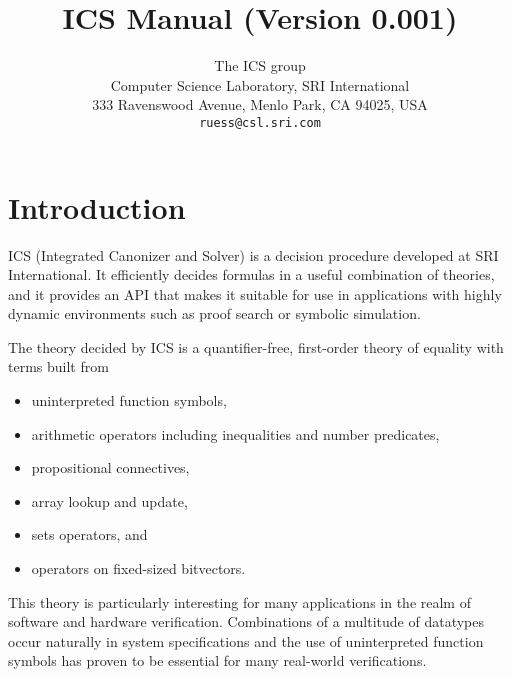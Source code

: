 \documentclass[12pt]{article}
\title{ICS Manual (Version 0.001)}
\author{The ICS group\\[0.3em]
  {\small Computer Science Laboratory, SRI International} \\[-0.2em]
  {\small 333 Ravenswood Avenue, Menlo Park, CA 94025, USA} \\[-0.2em]
  {\small\texttt{ruess@csl.sri.com}}}
\date{}
\begin{document}
\maketitle
\tableofcontents

\section{Introduction}\label{sec:intro}

ICS (Integrated Canonizer and Solver) is a
decision procedure developed at SRI International.
It efficiently decides formulas in a useful combination
of theories, and it provides an API that makes
it suitable for use in applications with highly dynamic
environments such as proof search or symbolic simulation.

The theory decided by ICS is a quantifier-free,
first-order theory of equality with terms built from
  \begin{itemize}
  \item uninterpreted function symbols,
  \item arithmetic operators including inequalities and number predicates,
  \item propositional connectives,
  \item array lookup and update,
  \item sets operators, and
  \item operators on fixed-sized bitvectors.
  \end{itemize}
This theory is particularly interesting for many applications in the realm
of software and hardware verification.  Combinations of a multitude
of datatypes occur naturally in system specifications and the use of
uninterpreted function symbols has proven to be essential
for many real-world verifications.
\end{document}
